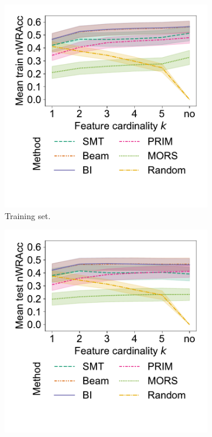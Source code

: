 \documentclass{article}
\theoremstyle{definition}
\begin{document}
\begin{figure}[t]
	\centering
	\begin{subfigure}[t]{0.48\textwidth}
		\centering
		\includegraphics[width=\textwidth, trim=15 55 15 15, clip]{plots/csd-cardinality-train-nwracc.pdf}
		\caption{Training set.}
		\label{fig:csd:cardinality-train-nwracc}
	\end{subfigure}
	\hfill
	\begin{subfigure}[t]{0.48\textwidth}
		\centering
		\includegraphics[width=\textwidth, trim=15 55 15 15, clip]{plots/csd-cardinality-test-nwracc.pdf}

\end{subfigure}
\end{figure}
\end{document}
